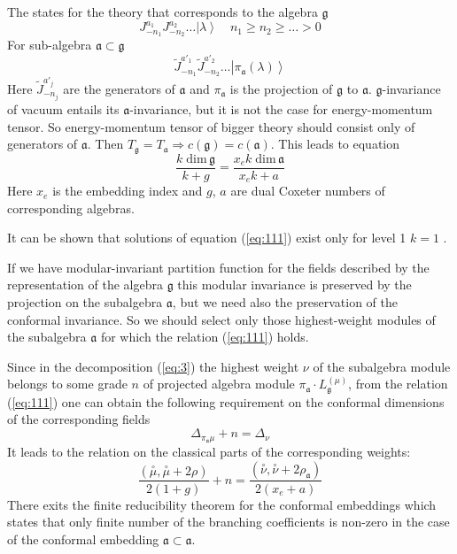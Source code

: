 \documentclass[a4paper,12pt]{article}
\theoremstyle{definition} \newtheorem{Def}{Definition}
\begin{document}
The states for the theory that corresponds to the algebra $\mathfrak{g}$
\begin{equation}
  \label{eq:109}
  J^{a_1}_{-n_1}J^{a_2}_{-n_2}\dots\left|\lambda\right>\quad n_1\geq n_2\geq\dots>0
\end{equation}
For sub-algebra $\mathfrak{a}\subset\mathfrak{g}$
\begin{equation}
  \label{eq:110}
  \tilde{J}^{a'_1}_{-n_1}\tilde{J}^{a'_2}_{-n_2}\dots\left|\pi_{\mathfrak{a}}(\lambda)\right>
\end{equation}
Here $\tilde{J}^{a'_j}_{-n_j}$ are the generators of $\mathfrak{a}$ and $\pi_{\mathfrak{a}}$ is the projection of $\mathfrak{g}$ to $\mathfrak{a}$. $\mathfrak{g}$-invariance of vacuum entails its $\mathfrak{a}$-invariance, but it is not the case for energy-momentum tensor. So energy-momentum tensor of bigger theory should consist only of generators of $\mathfrak{a}$. Then $T_{\mathfrak{g}}=T_{\mathfrak{a}}\Rightarrow c(\mathfrak{g})=c(\mathfrak{a})$. This leads to equation
\begin{equation}
  \label{eq:111}
  \frac{k\;\mathrm{dim}\,\mathfrak{g}}{k+g}=\frac{x_e k\; \mathrm{dim}\,\mathfrak{a}}{x_ek+a}
\end{equation}
Here $x_e$ is the embedding index and $g$, $a$ are dual Coxeter numbers of corresponding algebras. 

It can be shown that solutions of equation (\ref{eq:111}) exist only
for level 1 $k=1$ \cite{difrancesco1997cft}.

If we have modular-invariant partition function for the fields described by the representation of the algebra $\mathfrak{g}$ this modular invariance is preserved by the projection on the subalgebra $\mathfrak{a}$, but we need also the preservation of the conformal invariance. So we should select only those highest-weight modules of the subalgebra $\mathfrak{a}$ for which the relation (\ref{eq:111}) holds.

Since in the decomposition (\ref{eq:3}) the highest weight $\nu$ of the subalgebra module belongs to some grade $n$ of projected algebra module $\pi_{\mathfrak{a}}\cdot L^{(\mu)}_{\mathfrak{g}}$, from the relation (\ref{eq:111}) one can obtain the following requirement on the conformal dimensions of the corresponding fields
\begin{equation}
  \label{eq:32}
   \Delta_{\pi_{\mathfrak{a}}\mu}+n=\Delta_{\nu}
\end{equation}
It leads to the relation on the classical parts of the corresponding weights:
\begin{equation}
  \label{eq:33}
  \frac{(\overset{\circ }{\mu},\overset{\circ }{\mu}+2\rho)}{2(1+g)}+n=\frac{(\overset{\circ }{\nu},\overset{\circ }{\nu}+2\rho_{\mathfrak{a}})}{2(x_e+a)}
\end{equation}
There exits the finite reducibility theorem for the conformal embeddings which states that only finite number of the branching coefficients is non-zero in the case of the conformal embedding $\mathfrak{a}\subset\mathfrak{a}$.
\end{document}
